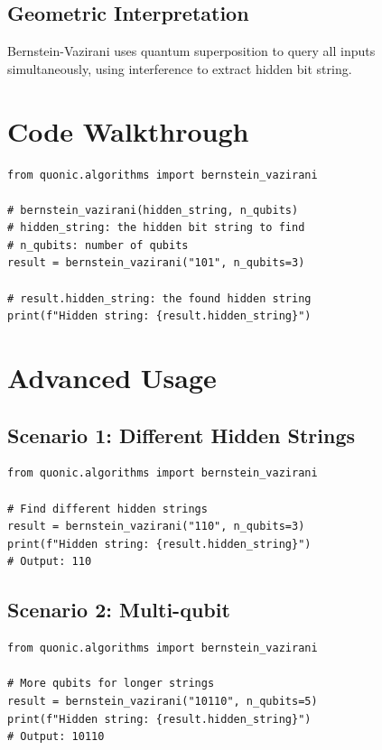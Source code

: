 \documentclass[12pt,a4paper]{article}
\begin{document}
\subsection{Geometric Interpretation}

Bernstein-Vazirani uses quantum superposition to query all inputs simultaneously, using interference to extract hidden bit string.

\section{Code Walkthrough}

\begin{verbatim}
from quonic.algorithms import bernstein_vazirani

# bernstein_vazirani(hidden_string, n_qubits)
# hidden_string: the hidden bit string to find
# n_qubits: number of qubits
result = bernstein_vazirani("101", n_qubits=3)

# result.hidden_string: the found hidden string
print(f"Hidden string: {result.hidden_string}")
\end{verbatim}

\section{Advanced Usage}

\subsection{Scenario 1: Different Hidden Strings}

\begin{verbatim}
from quonic.algorithms import bernstein_vazirani

# Find different hidden strings
result = bernstein_vazirani("110", n_qubits=3)
print(f"Hidden string: {result.hidden_string}")
# Output: 110
\end{verbatim}

\subsection{Scenario 2: Multi-qubit}

\begin{verbatim}
from quonic.algorithms import bernstein_vazirani

# More qubits for longer strings
result = bernstein_vazirani("10110", n_qubits=5)
print(f"Hidden string: {result.hidden_string}")
# Output: 10110
\end{verbatim}
\end{document}
